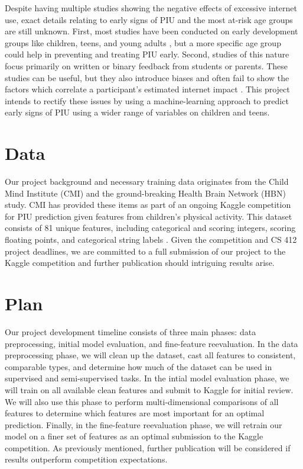 \documentclass[12pt]{extarticle}
\begin{document}
Despite having multiple studies showing the negative effects of excessive internet use, exact details relating to early signs of PIU and the most at-risk age groups are still unknown.
First, most studies have been conducted on early development groups like children, teens, and young adults \cite{Pettorruso2020-qt,Cash2012-rb,Aboujaoude2010-mc,Restrepo2020-pb}, but a more specific age group could help in preventing and treating PIU early.
Second, studies of this nature focus primarily on written or binary feedback from students or parents. 
These studies can be useful, but they also introduce biases and often fail to show the factors which correlate a participant's estimated internet impact \cite{Restrepo2020-pb,Aboujaoude2010-mc}.
This project intends to rectify these issues by using a machine-learning approach to predict early signs of PIU using a wider range of variables on children and teens.

\section{Data}

Our project background and necessary training data originates from the Child Mind Institute (CMI) and the ground-breaking Health Brain Network (HBN) study.
CMI has provided these items as part of an ongoing Kaggle competition for PIU prediction given features from children's physical activity. 
This dataset consists of 81 unique features, including categorical and scoring integers, scoring floating points, and categorical string labels \cite{child-mind-institute-problematic-internet-use}.
Given the competition and CS 412 project deadlines, we are committed to a full submission of our project to the Kaggle competition and further publication should intriguing results arise.

\section{Plan}

Our project development timeline consists of three main phases: data preprocessing, initial model evaluation, and fine-feature reevaluation.
In the data preprocessing phase, we will clean up the dataset, cast all features to consistent, comparable types, and determine how much of the dataset can be used in supervised and semi-supervised tasks.
In the intial model evaluation phase, we will train on all available clean features and submit to Kaggle for initial review. 
We will also use this phase to perform multi-dimensional comparisons of all features to determine which features are most important for an optimal prediction.
Finally, in the fine-feature reevaluation phase, we will retrain our model on a finer set of features as an optimal submission to the Kaggle competition.
As previously mentioned, further publication will be considered if results outperform competition expectations.



\end{document}
